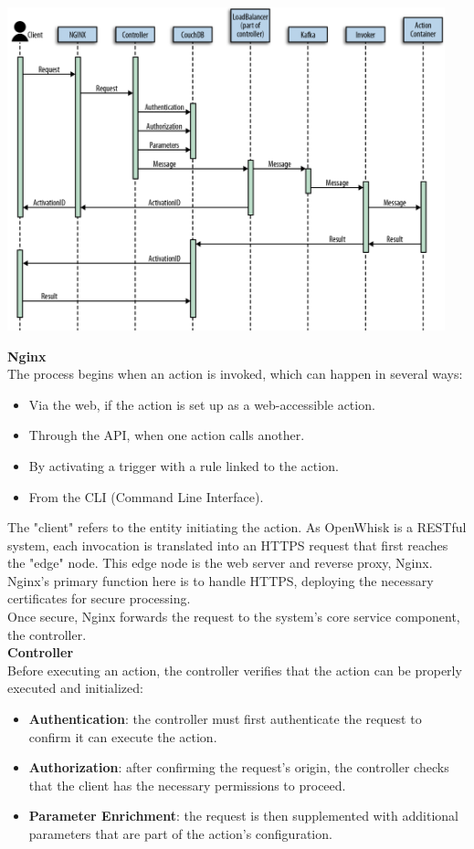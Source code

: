\begin{center}
    \includegraphics[width=0.95\textwidth]{img/sequence.png}
    \vspace{10pt}
\end{center}
\textbf{Nginx}\\
The process begins when an action is invoked, which can happen in several ways:
\begin{itemize}
    \item Via the web, if the action is set up as a web-accessible action.
    \item Through the API, when one action calls another.
    \item By activating a trigger with a rule linked to the action.
    \item From the CLI (Command Line Interface).
\end{itemize}
The "client" refers to the entity initiating the action. As OpenWhisk is a RESTful system, each invocation is translated into an HTTPS request that first reaches the "edge" node. This edge node is the web server and reverse proxy, Nginx. Nginx’s primary function here is to handle HTTPS, deploying the necessary certificates for secure processing.\\
Once secure, Nginx forwards the request to the system's core service component, the controller.\vspace{14pt}\\
\textbf{Controller}\\
Before executing an action, the controller verifies that the action can be properly executed and initialized:
\begin{itemize}
    \item \textbf{Authentication}: the controller must first authenticate the request to confirm it can execute the action.
    \item \textbf{Authorization}: after confirming the request’s origin, the controller checks that the client has the necessary permissions to proceed.
    \item \textbf{Parameter Enrichment}: the request is then supplemented with additional parameters that are part of the action’s configuration.
\end{itemize}
